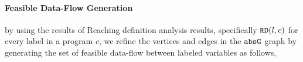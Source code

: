 \paragraph{Feasible Data-Flow Generation}
by using the results of Reaching definition analysis results, specifically $\mathtt{RD}(l, c)$ for every label in a program $c$, we refine the vertices and edges in the $\mathtt{abs}{\mathtt{G}}$ graph 
by generating the set of feasible data-flow between labeled variables as follows,
%
%
